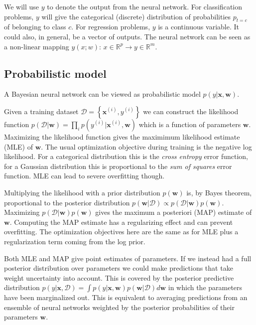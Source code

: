 \documentclass[%
oneside,                 %
final,                   %
10pt]{article}
\newenvironment{notice_mdfboxadmon}[1][]{
\begin{notice_mdfboxmdframed}[frametitle=#1]
}
{
\end{notice_mdfboxmdframed}
}
\begin{document}
\noindent

\begin{notice_mdfboxadmon}[Notice]
We will use $y$ to denote the output from the neural network. For classification problems, $y$ will give the categorical (discrete) distribution of probabilities $p_{t=c}$ of belonging to class $c$. For regression problems, $y$ is a continuous variable. It could also, in general, be a vector of outputs. The neural network can be seen as a non-linear mapping $y(x; w)$: $x \in \mathbb{R}^p \to y \in \mathbb{R}^m$.
\end{notice_mdfboxadmon} %



\subsection{Probabilistic model}

A Bayesian neural network can be viewed as probabilistic model $p(y \lvert \mathbf{x},\mathbf{w})$. 

Given a training dataset $\mathcal{D} = \left\{\mathbf{x}^{(i)}, y^{(i)}\right\}$ we can construct the likelihood function $p(\mathcal{D} \lvert \mathbf{w}) = \prod_i p(y^{(i)} \lvert \mathbf{x}^{(i)}, \mathbf{w})$ which is a function of parameters $\mathbf{w}$. Maximizing the likelihood function gives the maximimum likelihood estimate (MLE) of $\mathbf{w}$. The usual optimization objective during training is the negative log likelihood. For a categorical distribution this is the \emph{cross entropy} error function, for a Gaussian distribution this is proportional to the \emph{sum of squares} error function. MLE can lead to severe overfitting though.

Multiplying the likelihood with a prior distribution $p(\mathbf{w})$ is, by Bayes theorem, proportional to the posterior distribution $p(\mathbf{w} \lvert \mathcal{D}) \propto p(\mathcal{D} \lvert \mathbf{w}) p(\mathbf{w})$. Maximizing $p(\mathcal{D} \lvert \mathbf{w}) p(\mathbf{w})$ gives the maximum a posteriori (MAP) estimate of $\mathbf{w}$. Computing the MAP estimate has a regularizing effect and can prevent overfitting. The optimization objectives here are the same as for MLE plus a regularization term coming from the log prior.

Both MLE and MAP give point estimates of parameters. If we instead had a full posterior distribution over parameters we could make predictions that take weight uncertainty into account. This is covered by the posterior predictive distribution $p(y \lvert \mathbf{x},\mathcal{D}) = \int p(y \lvert \mathbf{x}, \mathbf{w}) p(\mathbf{w} \lvert \mathcal{D}) d\mathbf{w}$ in which the parameters have been marginalized out. This is equivalent to averaging predictions from an ensemble of neural networks weighted by the posterior probabilities of their parameters $\mathbf{w}$.
\end{document}
